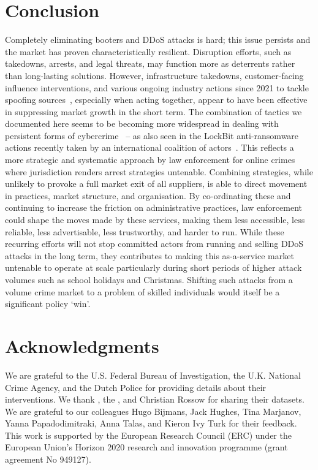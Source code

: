 \documentclass[letterpaper,twocolumn,10pt]{article}
\begin{document}
\section{Conclusion} \label{sec:conclusion}
Completely eliminating booters and DDoS attacks is hard; this issue persists and the market has proven characteristically resilient. Disruption efforts, such as takedowns, arrests, and legal threats, may function more as deterrents rather than long-lasting solutions. However, infrastructure takedowns, customer-facing influence interventions, and various ongoing industry actions since 2021 to tackle spoofing sources~\cite{collier2024peer}, especially when acting together, appear to have been effective in suppressing market growth in the short term. The combination of tactics we documented here seems to be becoming more widespread in dealing with persistent forms of cybercrime~\cite{collier2022influence} -- as also seen in the LockBit anti-ransomware actions recently taken by an international coalition of actors~\cite{lockbitintervention}. This reflects a more strategic and systematic approach by law enforcement for online crimes where jurisdiction renders arrest strategies untenable. Combining strategies, while unlikely to provoke a full market exit of all suppliers, is able to direct movement in practices, market structure, and organisation. By co-ordinating these and continuing to increase the friction on administrative practices, law enforcement could shape the moves made by these services, making them less accessible, less reliable, less advertisable, less trustworthy, and harder to run. While these recurring efforts will not stop committed actors from running and selling DDoS attacks in the long term, they contributes to making this as-a-service market untenable to operate at scale particularly during short periods of higher attack volumes such as school holidays and Christmas. Shifting such attacks from a volume crime market to a problem of skilled individuals would itself be a significant policy `win'.
\label{endofbody}

\section*{Acknowledgments} \label{sec:acknowledgments}
We are grateful to the U.S. Federal Bureau of Investigation, the U.K. National Crime Agency, and the Dutch Police for providing details about their interventions. We thank \netscout, the \ccc, and Christian Rossow for sharing their datasets. We are grateful to our colleagues Hugo Bijmans, Jack Hughes, Tina Marjanov, Yanna Papadodimitraki, Anna Talas, and Kieron Ivy Turk for their feedback. This work is supported by the European Research Council (ERC) under the European Union's Horizon 2020 research and innovation programme (grant agreement No 949127).
\end{document}
